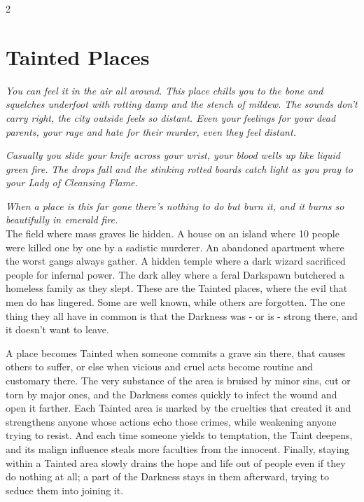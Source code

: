 \begin{multicols}{2}
\section*{Tainted Places}
\label{sec:TaintedPlaces}

\label{TaintedPlaceRef}

\textit{You can feel it in the air all around. This place chills you to the bone and squelches underfoot with rotting damp and the stench of mildew. The sounds don't carry right, the city outside feels so distant. Even your feelings for your dead parents, your rage and hate for their murder, even they feel distant.}

\textit{Casually you slide your knife across your wrist, your blood wells up like liquid green fire. The drops fall and the stinking rotted boards catch light as you pray to your Lady of Cleansing Flame.}

\textit{When a place is this far gone there's nothing to do but burn it, and it burns so beautifully in emerald fire.} \\

\noindent The field where mass graves lie hidden. A house on an island where 10 people were killed one by one by a sadistic murderer. An abandoned apartment where the worst gangs always gather. A hidden temple where a dark wizard sacrificed people for infernal power. The dark alley where a feral Darkspawn butchered a homeless family as they slept. These are the Tainted places, where the evil that men do has lingered. Some are well known, while others are forgotten. The one thing they all have in common is that the Darkness was - or is - strong there, and it doesn't want to leave.

A place becomes Tainted when someone commits a grave sin there, that causes others to suffer, or else when vicious and cruel acts become routine and customary there. The very substance of the area is bruised by minor sins, cut or torn by major ones, and the Darkness comes quickly to infect the wound and open it farther. Each Tainted area is marked by the cruelties that created it and strengthens anyone whose actions echo those crimes, while weakening anyone trying to resist. And each time someone yields to temptation, the Taint deepens, and its malign influence steals more faculties from the innocent. Finally, staying within a Tainted area slowly drains the hope and life out of people even if they do nothing at all; a part of the Darkness stays in them afterward, trying to seduce them into joining it.


\end{multicols}
